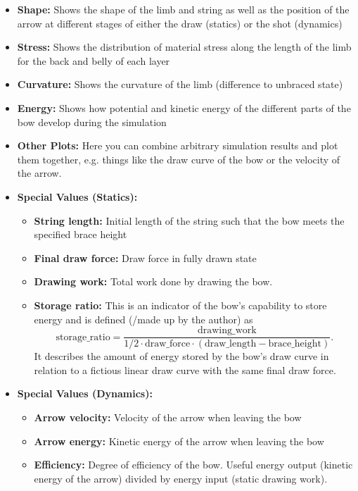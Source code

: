 \documentclass[12pt]{article}
\begin{document}
\begin{itemize}
\item \textbf{Shape:} Shows the shape of the limb and string as well as the position of the arrow at different stages of either the draw (statics) or the shot (dynamics)
\item \textbf{Stress:} Shows the distribution of material stress along the length of the limb for the back and belly of each layer
\item \textbf{Curvature:} Shows the curvature of the limb (difference to unbraced state)
\item \textbf{Energy:} Shows how potential and kinetic energy of the different parts of the bow develop during the simulation
\item \textbf{Other Plots:} Here you can combine arbitrary simulation results and plot them together, e.g. things like the draw curve of the bow or the velocity of the arrow.
\\
\item \textbf{Special Values (Statics):}
    \begin{itemize}
    \item \textbf{String length:} Initial length of the string such that the bow meets the specified brace height
    \item \textbf{Final draw force:} Draw force in fully drawn state
    \item \textbf{Drawing work:} Total work done by drawing the bow.
    \item \textbf{Storage ratio:} This is an indicator of the bow's capability to store energy and is defined (/made up by the author) as
$$\mathrm{storage\_ ratio} = \frac{\mathrm{drawing\_ work}}{1/2\cdot \mathrm{draw\_ force}\cdot (\mathrm{draw\_ length} - \mathrm{brace\_ height})}.$$
It describes the amount of energy stored by the bow's draw curve in relation to a fictious linear draw curve with the same final draw force.
\\
    \end{itemize}
\item \textbf{Special Values (Dynamics):}
    \begin{itemize}
    \item \textbf{Arrow velocity:} Velocity of the arrow when leaving the bow
    \item \textbf{Arrow energy:} Kinetic energy of the arrow when leaving the bow
    \item \textbf{Efficiency:} Degree of efficiency of the bow. Useful energy output (kinetic energy of the arrow) divided by energy input (static drawing work).
    \end{itemize}
\end{itemize}
\end{document}
